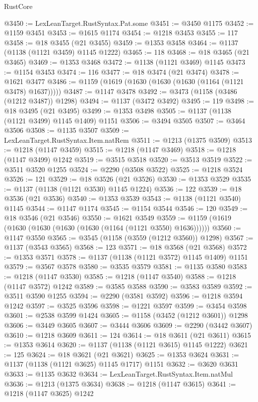 \begin{lexlean}{RustCore}
\begin{coremodule}
@3450 := LexLeanTarget.RustSyntax.Pat.some
@3451 := @3450 @1175
@3452 := @1159 @3451
@3453 := @1615 @1174
@3454 := @1218 @3453
@3455 := 117
@3458 := @18 @3455 (@21 @3455)
@3459 := @1353 @3458
@3464 := @1137 (@1138 (@1121 @3459) @1145 @1222)
@3465 := 118
@3468 := @18 @3465 (@21 @3465)
@3469 := @1353 @3468
@3472 := @1138 (@1121 @3469) @1145
@3473 := @1154 @3453
@3474 := 116
@3477 := @18 @3474 (@21 @3474)
@3478 := @1621 @3477
@3486 := @1159 (@1619 (@1630 (@1630 (@1630 (@1164 (@1121 @3478) @1637)))))
@3487 := @1147 @3478
@3492 := @3473 (@1158 (@3486 (@1212 @3487)) @1298)
@3494 := @1137 (@3472 @3492)
@3495 := 119
@3498 := @18 @3495 (@21 @3495)
@3499 := @1353 @3498
@3505 := @1137 (@1138 (@1121 @3499) @1145 @1409) @1151
@3506 := @3494 @3505
@3507 := @3464 @3506
@3508 := @1135 @3507
@3509 := LexLeanTarget.RustSyntax.Item.natRem
@3511 := @1213 (@1375 @3509)
@3513 := @1218 (@1147 @3459)
@3515 := @1218 (@1147 @3469)
@3518 := @1218 (@1147 @3499) @1242
@3519 := @3515 @3518
@3520 := @3513 @3519
@3522 := @3511 @3520 @1255
@3524 := @2290 (@3508 @3522)
@3525 := @1218 @3524
@3526 := 121
@3529 := @18 @3526 (@21 @3526)
@3530 := @1353 @3529
@3535 := @1137 (@1138 (@1121 @3530) @1145 @1224)
@3536 := 122
@3539 := @18 @3536 (@21 @3536)
@3540 := @1353 @3539
@3543 := @1138 (@1121 @3540) @1145
@3544 := @1147 @1174
@3545 := @1154 @3544
@3546 := 120
@3549 := @18 @3546 (@21 @3546)
@3550 := @1621 @3549
@3559 := @1159 (@1619 (@1630 (@1630 (@1630 (@1630 (@1164 (@1121 @3550) @1636))))))
@3560 := @1147 @3550
@3565 := @3545 (@1158 (@3559 (@1212 @3560)) @1298)
@3567 := @1137 (@3543 @3565)
@3568 := 123
@3571 := @18 @3568 (@21 @3568)
@3572 := @1353 @3571
@3578 := @1137 (@1138 (@1121 @3572) @1145 @1409) @1151
@3579 := @3567 @3578
@3580 := @3535 @3579
@3581 := @1135 @3580
@3583 := @1218 (@1147 @3530)
@3585 := @1218 (@1147 @3540)
@3588 := @1218 (@1147 @3572) @1242
@3589 := @3585 @3588
@3590 := @3583 @3589
@3592 := @3511 @3590 @1255
@3594 := @2290 (@3581 @3592)
@3596 := @1218 @3594 @1242
@3597 := @3525 @3596
@3598 := @1221 @3597
@3599 := @3454 @3598
@3601 := @2538 @3599 @1424
@3605 := @1158 (@3452 (@1212 @3601)) @1298
@3606 := @3449 @3605
@3607 := @3444 @3606
@3609 := @2290 (@3442 @3607)
@3610 := @1218 @3609
@3611 := 124
@3614 := @18 @3611 (@21 @3611)
@3615 := @1353 @3614
@3620 := @1137 (@1138 (@1121 @3615) @1145 @1222)
@3621 := 125
@3624 := @18 @3621 (@21 @3621)
@3625 := @1353 @3624
@3631 := @1137 (@1138 (@1121 @3625) @1145 @1717) @1151
@3632 := @3620 @3631
@3633 := @1135 @3632
@3634 := LexLeanTarget.RustSyntax.Item.natMul
@3636 := @1213 (@1375 @3634)
@3638 := @1218 (@1147 @3615)
@3641 := @1218 (@1147 @3625) @1242

\end{coremodule}
\end{lexlean}
